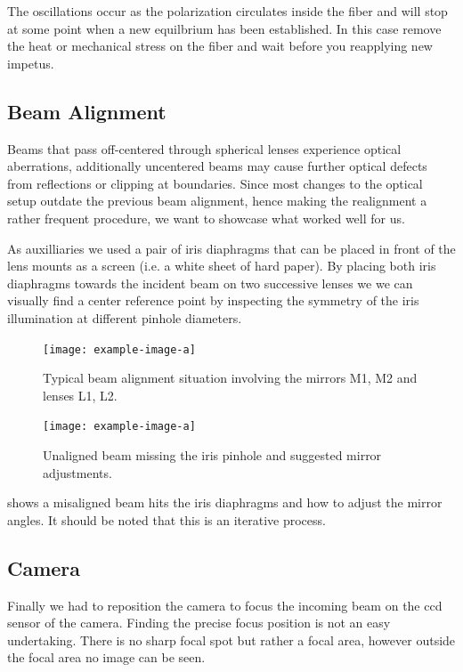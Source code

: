 The oscillations occur as the polarization circulates inside the fiber and
will stop at some point when a new equilbrium has been established. In this
case remove the heat or mechanical stress on the fiber and wait before you
reapplying new impetus.

\subsection{Beam Alignment}

Beams that pass off-centered through spherical lenses experience optical
aberrations, additionally uncentered beams may cause further optical defects
from reflections or clipping at boundaries. Since most changes to the optical
setup outdate the previous beam alignment, hence making the realignment
a rather frequent procedure, we want to showcase what worked well for us.

As auxilliaries we used a pair of iris diaphragms that can be placed in front
of the lens mounts as a screen (i.e. a white sheet of hard paper). By placing
both iris diaphragms towards the incident beam on two successive lenses we
we can visually find a center reference point by inspecting the symmetry of
the iris illumination at different pinhole diameters.

\begin{figure}[ht]
  \centering
    \texttt{[image: example-image-a]}
    \caption{Typical beam alignment situation involving the mirrors M1, M2 and
    lenses L1, L2.}
    \label{fig:beamalign:setup}
  \endminipage
  \hfill
    \texttt{[image: example-image-a]}
    \caption{Unaligned beam missing the iris pinhole and suggested mirror
    adjustments.}
    \label{fig:beamalign:iris}
  \endminipage
  \hfill
\end{figure}

 shows a misaligned beam hits the iris diaphragms
and how to adjust the mirror angles. It should be noted that this is an
iterative process.

\subsection{Camera}

Finally we had to reposition the camera to focus the incoming beam on the
\gls{ccd} sensor of the camera. Finding the precise focus position is not an
easy undertaking. There is no sharp focal spot but rather a focal area,
however outside the focal area no image can be seen.

